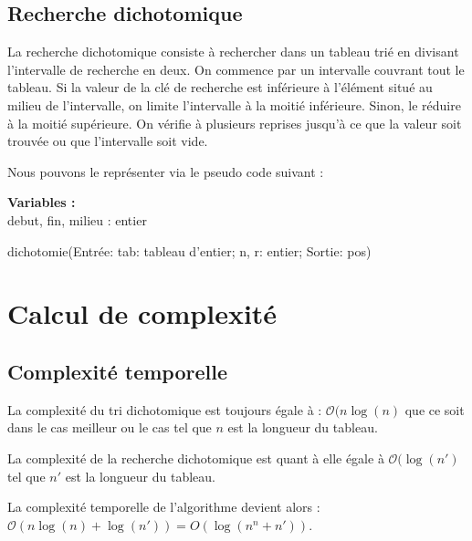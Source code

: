 \subsection{Recherche dichotomique}
La recherche dichotomique consiste à rechercher dans un tableau trié en divisant l'intervalle de recherche en deux.
On commence par un intervalle couvrant tout le tableau. Si la valeur de la clé de recherche est inférieure à l'élément situé au milieu de l'intervalle, on limite l'intervalle à la moitié inférieure. Sinon, le réduire à la moitié supérieure. On vérifie à plusieurs reprises jusqu'à ce que la valeur soit trouvée ou que l'intervalle soit vide.
\par
Nous pouvons le représenter via le pseudo code suivant :

\begin{function}[H]
    \textbf{Variables :}\\
    debut, fin, milieu : entier\;
    \caption{dichotomie(Entrée: tab: tableau d'entier; n, r: entier; Sortie: pos)}
\end{function}

\section{Calcul de complexité}
\subsection{Complexité temporelle}
La complexité du tri dichotomique est toujours égale à : $\mathcal{O}(n \log(n)$ que ce soit dans le cas meilleur ou le cas tel que $n$ est la longueur du tableau.
\par
La complexité de la recherche dichotomique  est quant à elle égale à $\mathcal{O}(\log(n')$ tel que $n'$ est la longueur du tableau.
\par
La complexité temporelle de l'algorithme devient alors : $\mathcal{O}(n \log(n) + \log(n')) = {O}(\log(n^n + n'))$.\\


